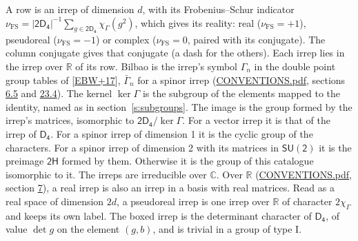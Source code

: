 \documentclass[10pt,a4paper]{article}
\numberwithin{equation}{section}
\newcommand{\grp}[1]{\mathsf{#1}}
\newcommand{\irchar}[1]{\chi_{#1}}
\newcommand{\fsind}{\nu_{\mathrm{FS}}}
\begin{document}
\leavevmode\label{n:index.frobenius}\label{n:head.irrep}\label{n:head.reality}A row is an irrep of dimension $d$, with its Frobenius--Schur indicator $\fsind = |\grp{2D_{4}}|^{-1}\allowbreak\sum_{g\in\grp{2D_{4}}}\irchar{\Gamma}(g^2)$, which gives its reality: real ($\fsind = +1$), pseudoreal ($\fsind = -1$) or complex ($\fsind = 0$, paired with its conjugate). \label{n:head.conjugate}The column conjugate gives that conjugate (a dash for the others). \label{n:head.over.real}Each irrep lies in the irrep over $\mathbb{R}$ of its row. \label{n:head.bilbao}\label{n:irrep.alias.gamma}Bilbao is the irrep's symbol $\Gamma_n$ in the double point group tables of [\href{../../../REFERENCES.pdf\#ref.EBW+17}{EBW+17}], $\bar{\Gamma}_n$ for a spinor irrep (\href{../../CONVENTIONS.pdf}{CONVENTIONS.pdf}, sections \href{../../../rotation/CONVENTIONS.pdf\#conv.6.5}{6.5} and \href{../../CONVENTIONS.pdf\#conv.23.4}{23.4}). \label{n:head.kernel}The kernel $\ker\Gamma$ is the subgroup of the elements mapped to the identity, named as in section~\ref{s:subgroups}. \label{n:head.image}The image is the group formed by the irrep's matrices, isomorphic to $\grp{2D_{4}}/\ker\Gamma$. For a vector irrep it is that of the irrep of \href{../../../rotation/data/pdf/D4.pdf}{$\grp{D_{4}}$}. For a spinor irrep of dimension 1 it is the cyclic group of the characters. For a spinor irrep of dimension 2 with its matrices in $\grp{SU(2)}$ it is the preimage $\grp{2H}$ formed by them. Otherwise it is the group of this catalogue isomorphic to it. The irreps are irreducible over $\mathbb{C}$. Over $\mathbb{R}$ (\href{../../CONVENTIONS.pdf}{CONVENTIONS.pdf}, section \href{../../../rotation/CONVENTIONS.pdf\#conv.7}{7}), a real irrep is also an irrep in a basis with real matrices. Read as a real space of dimension $2d$, a pseudoreal irrep is one irrep over $\mathbb{R}$ of character $2\irchar{\Gamma}$ and keeps its own label. \label{n:mark.determinant}The boxed irrep is the determinant character of \href{../../../rotation/data/pdf/D4.pdf}{$\grp{D_{4}}$}, of value $\det g$ on the element $(g, b)$, and is trivial in a group of type I.
\setlength{\emergencystretch}{2em}\par\setlength{\emergencystretch}{0pt}
\end{document}
